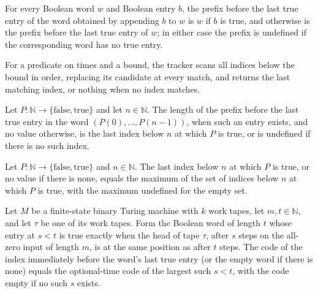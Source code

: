 \begin{lemma}
\label{Complexity.clLastMarker_step}
\leanok
{}
For every Boolean word $w$ and Boolean entry $b$, the prefix before the last true entry
of the word obtained by appending $b$ to $w$ is $w$ if $b$ is true, and otherwise is the
prefix before the last true entry of $w$; in either case the prefix is undefined if the
corresponding word has no true entry.
\end{lemma}

\begin{definition}
\label{Complexity.clLastIndex}
\leanok
For a predicate on times and a bound, the tracker scans all indices below the bound in order, replacing its candidate at every match, and returns the last matching index, or nothing when no index matches.
\end{definition}

\begin{lemma}
\label{Complexity.clLastIndex_marker}
\leanok
{}
Let $P\colon\mathbb{N}\to\{\mathrm{false},\mathrm{true}\}$ and let $n\in\mathbb{N}$. The
length of the prefix before the last true entry in the word $(P(0),\ldots,P(n-1))$, when
such an entry exists, and no value otherwise, is the last index below $n$ at which $P$
is true, or is undefined if there is no such index.
\end{lemma}

\begin{lemma}
\label{Complexity.clLastIndex_max}
\leanok
{}
Let $P\colon\mathbb{N}\to\{\mathrm{false},\mathrm{true}\}$ and $n\in\mathbb{N}$. The
last index below $n$ at which $P$ is true, or no value if there is none, equals the
maximum of the set of indices below $n$ at which $P$ is true, with the maximum undefined
for the empty set.
\end{lemma}

\begin{lemma}
\label{Complexity.clLastCode_prev}
\leanok
{}
Let $M$ be a finite-state binary Turing machine with $k$ work tapes, let
$m,t\in\mathbb{N}$, and let $\tau$ be one of its work tapes. Form the Boolean word of
length $t$ whose entry at $s<t$ is true exactly when the head of tape $\tau$, after $s$
steps on the all-zero input of length $m$, is at the same position as after $t$ steps.
The code of the index immediately before the word's last true entry (or the empty word
if there is none) equals the optional-time code of the largest such $s<t$, with the code
empty if no such $s$ exists.
\end{lemma}

